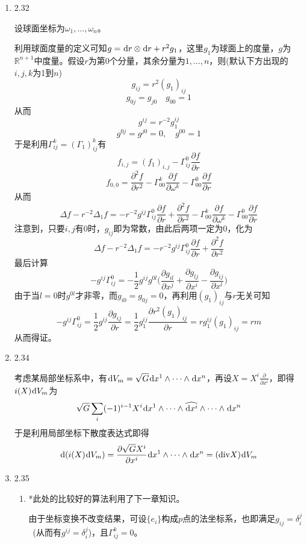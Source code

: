 \documentclass[a4paper,UTF8,fontset=windows,10pt]{ctexart}
\newcommand*{\dr}{\hspace{0.07em}\mathrm{d}}
\begin{document}
\begin{enumerate}
    \item 2.32
    
    设球面坐标为$\omega_1,\dots,\omega_n$。
    
    利用球面度量的定义可知$g=\dr r\otimes \dr r+r^2g_1$，这里$g_1$为球面上的度量，$g$为$\mathbb{R}^{n+1}$中度量。假设$r$为第0个分量，其余分量为$1,\dots,n$，则(默认下方出现的$i,j,k$为1到$n$)
    $$g_{ij}=r^2(g_1)_{ij}$$
    $$g_{0j}=g_{j0}\quad g_{00}=1$$
    从而
    $$g^{ij}=r^{-2}g_1^{ij}$$
    $$g^{0j}=g^{j0}=0,\quad g^{00}=1$$
    于是利用$\Gamma_{ij}^k=(\Gamma_1)_{ij}^k$有
    $$f_{i,j}=(f_1)_{i,j}-\Gamma_{ij}^0\frac{\partial f}{\partial r}$$
    $$f_{0,0}=\frac{\partial^2f}{\partial r^2}-\Gamma_{00}^k\frac{\partial f}{\partial\omega^k}-\Gamma_{00}^0\frac{\partial f}{\partial r}$$
    从而
    $$\Delta f-r^{-2}\Delta_1f=-r^{-2}g^{ij}\Gamma_{ij}^0\frac{\partial f}{\partial r}+\frac{\partial^2f}{\partial r^2}-\Gamma_{00}^k\frac{\partial f}{\partial\omega^k}-\Gamma_{00}^0\frac{\partial f}{\partial r}$$
    注意到，只要$i,j$有0时，$g_{ij}$即为常数，由此后两项一定为0，化为
    $$\Delta f-r^{-2}\Delta_1f=-r^{-2}g^{ij}\Gamma_{ij}^0\frac{\partial f}{\partial r}+\frac{\partial^2f}{\partial r^2}$$
    最后计算
    $$-g^{ij}\Gamma_{ij}^0=-\frac{1}{2}g^{ij}g^{0l}\bigg(\frac{\partial g_{il}}{\partial x^j}+\frac{\partial g_{lj}}{\partial x^i}-\frac{\partial g_{ij}}{\partial x^l}\bigg)$$
    由于当$l=0$时$g^{0l}$才非零，而$g_{i0}=g_{0j}=0$，再利用$(g_1)_{ij}$与$r$无关可知
    $$-g^{ij}\Gamma_{ij}^0=\frac{1}{2}g^{ij}\frac{\partial g_{ij}}{\partial r}=\frac{1}{2}g_1^{ij}\frac{\partial r^2(g_1)_{ij}}{\partial r}=rg_1^{ij}(g_1)_{ij}=rm$$
    从而得证。
    
    \item 2.34
    
    考虑某局部坐标系中，有$\dr V_m=\sqrt{G}\dr x^1\wedge\cdots\wedge\dr x^n$，再设$X=X^i\frac{\partial}{\partial x^i}$，即得$i(X)\dr V_m$为
    $$\sqrt{G}\sum_i(-1)^{i-1}X^i\dr x^1\wedge\cdots\wedge\widehat{\dr x^i}\wedge\cdots\wedge\dr x^n$$
    于是利用局部坐标下散度表达式即得
    $$\dr(i(X)\dr V_m)=\frac{\partial\sqrt{G}X^i}{\partial x^i}\dr x^1\wedge\cdots\wedge\dr x^n=(\mathrm{div} X)\dr V_m$$
    
    \item 2.35
    \begin{enumerate}[(1)]
        \item *此处的比较好的算法利用了下一章知识。
        
        由于坐标变换不改变结果，可设$\{e_i\}$构成$p$点的法坐标系，也即满足$g_{ij}=\delta_i^j$\ (从而有$g^{ij}=\delta_i^j$)，且$\Gamma_{ij}^k=0$。
    

\end{enumerate}
\end{enumerate}
\end{document}
